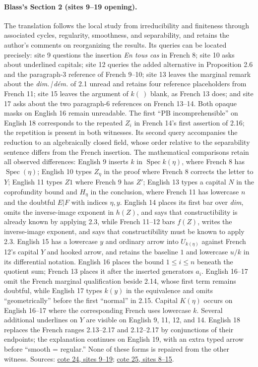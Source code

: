 \documentclass[10pt,a4paper]{article}
\begin{document}
\paragraph{Blass's Section 2 (sites 9--19 opening).}
The translation follows the local study from irreducibility and finiteness through associated cycles, regularity, smoothness, and separability, and retains the author's comments on reorganizing the results. Its queries can be located precisely: site 9 questions the insertion \emph{En tous cas} in French 8; site 10 asks about underlined capitals; site 12 queries the added alternative in Proposition 2.6 and the paragraph-3 reference of French 9--10; site 13 leaves the marginal remark about the \emph{dim.\,|\,dém.} of 2.1 unread and retains four reference placeholders from French 11; site 15 leaves the argument of $k(\ )$ blank, as French 13 does; and site 17 asks about the two paragraph-6 references on French 13--14. Both opaque masks on English 16 remain unreadable. The first ``PB incomprehensible'' on English 18 corresponds to the repeated $Z_i$ in French 14's first assertion of 2.16; the repetition is present in both witnesses. Its second query accompanies the reduction to an algebraically closed field, whose order relative to the separability sentence differs from the French insertion. The mathematical comparisons retain all observed differences: English 9 inserts $k$ in $\operatorname{Spec}k(\eta)$, where French 8 has $\operatorname{Spec}(\eta)$; English 10 types $Z_\eta$ in the proof where French 8 corrects the letter to $Y$; English 11 types $Z1$ where French 9 has $Z'$; English 13 types a capital $N$ in the coprofundity bound and $H_\eta$ in the conclusion, where French 11 has lowercase $n$ and the doubtful $E|F$ with indices $\eta,y$. English 14 places its first bar over \emph{dim}, omits the inverse-image exponent in $h(Z)$, and says that constructibility is already known by applying 2.3, while French 11--12 bars $f(Z)$, writes the inverse-image exponent, and says that constructibility must be known to apply 2.3. English 15 has a lowercase $y$ and ordinary arrow into $U_{k(\eta)}$ against French 12's capital $Y$ and hooked arrow, and retains the baseline $1$ and lowercase $u/k$ in its differential notation. English 16 places the bound $1\leq i\leq n$ beneath the quotient sum; French 13 places it after the inserted generators $a_i$. English 16--17 omit the French marginal qualification beside 2.14, whose first term remains doubtful, while English 17 types $k(y)$ in the equivalence and omits ``geometrically'' before the first ``normal'' in 2.15. Capital $K(\eta)$ occurs on English 16--17 where the corresponding French uses lowercase $k$. Several additional underlines on $Y$ are visible on English 9, 11, 12, and 14. English 18 replaces the French ranges 2.13--2.17 and 2.12--2.17 by conjunctions of their endpoints; the explanation continues on English 19, with an extra typed arrow before ``smooth = regular.'' None of these forms is repaired from the other witness. Sources: \href{https://grothendieck.umontpellier.fr/web/viewer.html?file=../24.pdf\#page=10}{cote 24, sites 9--19}; \href{https://grothendieck.umontpellier.fr/web/viewer.html?file=../25.pdf\#page=9}{cote 25, sites 8--15}.
\end{document}

